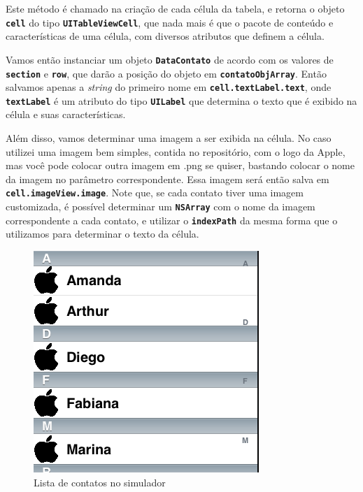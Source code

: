 \documentclass[a4paper,12pt,brazil,doubleside]{book}
\begin{document}
\begin{singlespace}
Este método é chamado na criação de cada célula da tabela, e retorna o objeto \texttt{\textbf{cell}} do tipo \texttt{\textbf{UITableViewCell}}, que nada mais é que o pacote de conteúdo e características de uma célula, com diversos atributos que definem a célula.

Vamos então instanciar um objeto \texttt{\textbf{DataContato}} de acordo com os valores de \texttt{\textbf{section}} e \texttt{\textbf{row}}, que darão a posição do objeto em \texttt{\textbf{contatoObjArray}}. Então salvamos apenas a \emph{string} do primeiro nome em \texttt{\textbf{cell.textLabel.text}}, onde \texttt{\textbf{textLabel}} é um atributo do tipo \texttt{\textbf{UILabel}} que determina o texto que é exibido na célula e suas características.

Além disso, vamos determinar uma imagem a ser exibida na célula. No caso utilizei uma imagem bem simples, contida no repositório, com o logo da Apple, mas você pode colocar outra imagem em .png se quiser, bastando colocar o nome da imagem no parâmetro correspondente. Essa imagem será então salva em \texttt{\textbf{cell.imageView.image}}. Note que, se cada contato tiver uma imagem customizada, é possível determinar um \texttt{\textbf{NSArray}} com o nome da imagem correspondente a cada contato, e utilizar o \texttt{\textbf{indexPath}} da mesma forma que o utilizamos para determinar o texto da célula.

\begin{figure}[H]
  \centering
  \includegraphics[width=.75\textwidth]{figuras/table/table3.png}
  \caption{Lista de contatos no simulador}
  \label{fig:a}
\end{figure}


\end{singlespace}
\end{document}
